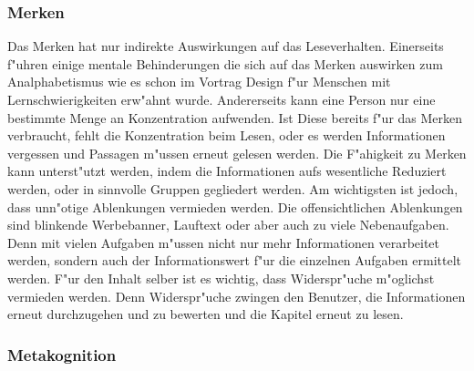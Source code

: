 \subsubsection{Merken}
Das Merken hat nur indirekte Auswirkungen auf das Leseverhalten. Einerseits f"uhren einige mentale Behinderungen die sich auf das Merken auswirken zum Analphabetismus wie es schon im Vortrag \glqq Design f"ur Menschen mit Lernschwierigkeiten\grqq{} erw"ahnt wurde. Andererseits kann eine Person nur eine bestimmte Menge an Konzentration aufwenden. Ist Diese bereits f"ur das Merken verbraucht, fehlt die Konzentration beim Lesen, oder es werden Informationen vergessen und Passagen m"ussen erneut gelesen werden. Die F"ahigkeit zu Merken kann unterst"utzt werden, indem die Informationen aufs wesentliche Reduziert werden, oder in sinnvolle Gruppen gegliedert werden. Am wichtigsten ist jedoch, dass unn"otige Ablenkungen vermieden werden.
Die offensichtlichen Ablenkungen sind blinkende Werbebanner, Lauftext oder aber auch zu viele Nebenaufgaben. Denn mit vielen Aufgaben m"ussen nicht nur mehr Informationen verarbeitet werden, sondern auch der Informationswert f"ur die einzelnen Aufgaben ermittelt werden. F"ur den Inhalt selber ist es wichtig, dass Widerspr"uche m"oglichst vermieden werden. Denn Widerspr"uche zwingen den Benutzer, die Informationen erneut durchzugehen und zu bewerten und die Kapitel erneut zu lesen.

\subsubsection{Metakognition}

